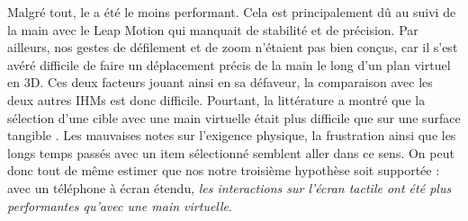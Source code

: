 Malgré tout, le  a été le moins performant. Cela est principalement dû au suivi de la main avec le Leap Motion qui manquait de stabilité et de précision. Par ailleurs, nos gestes de défilement et de zoom n'étaient pas bien conçus, car il s'est avéré difficile de faire un déplacement précis de la main le long d'un plan virtuel en 3D. Ces deux facteurs jouant ainsi en sa défaveur, la comparaison avec les deux autres IHMs est donc difficile. Pourtant, la littérature a montré que la sélection d'une cible avec une main virtuelle était plus difficile que sur une surface tangible \citep{Chan2010, Jones2012, Argelaguet2013}. Les mauvaises notes sur l'exigence physique, la frustration ainsi que les longs temps passés avec un item sélectionné semblent aller dans ce sens. On peut donc tout de même estimer que nos notre troisième hypothèse soit supportée : avec un téléphone à écran étendu, \emph{les interactions sur l'écran tactile ont été plus performantes qu'avec une main virtuelle}.


